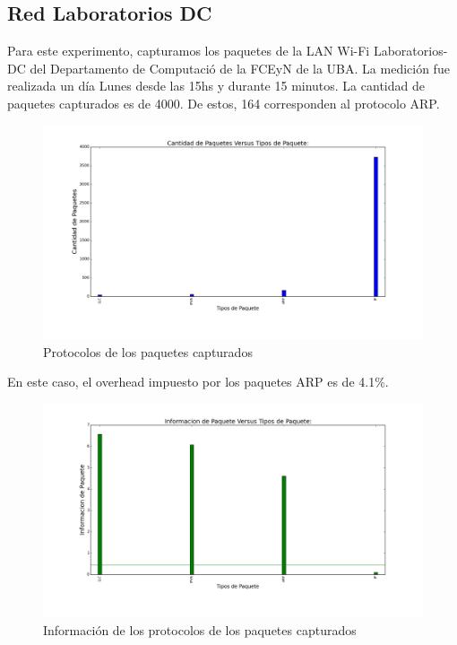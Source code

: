\subsection{Red Laboratorios DC}

Para este experimento, capturamos los paquetes de la LAN Wi-Fi Laboratorios-DC del Departamento de Computació de la FCEyN de la UBA. La medición fue realizada un día Lunes desde las 15hs y durante 15 minutos. La cantidad de paquetes capturados es de 4000. De estos, 164 corresponden al protocolo ARP.

\begin{figure}[H]
       \centering
       \includegraphics[width=1\textwidth]{../resultados/labo-corrida3/histogram_types.png}
       \caption{Protocolos de los paquetes capturados}
       \label{red-Starbucks-types}
\end{figure}

En este caso, el overhead impuesto por los paquetes ARP es de 4.1\%.

\begin{figure}[H]
       \centering
       \includegraphics[width=1\textwidth]{../resultados/labo-corrida3/histogram_types_information.png}
       \caption{Información de los protocolos de los paquetes capturados}
       \label{red-Starbucks-types-information}
\end{figure}

